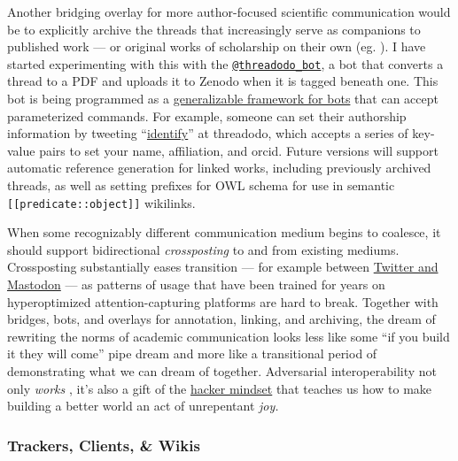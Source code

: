 Another bridging overlay for more author-focused scientific
communication would be to explicitly archive the threads that
increasingly serve as companions to published work --- or original works
of scholarship on their own (eg. \citep{bostonNeedKnowInformationSeeking2022} ). I have started experimenting
with this with the
\href{https://twitter.com/threadodo_bot}{\texttt{@threadodo\_bot}}, a
bot that converts a thread to a PDF and uploads it to Zenodo when it is tagged beneath one.
This bot is being programmed as a
\href{https://github.com/sneakers-the-rat/threadodo/blob/58d5f13f88728babdf2da0b34310c88349725566/threadodo/actions/commands.py\#L145-L168}{generalizable
framework for bots} that can accept parameterized commands. For example,
someone can set their authorship information by tweeting
``\href{https://twitter.com/json_dirs/status/1542305909983936512}{identify}''
at threadodo, which accepts a series of key-value pairs to set your
name, affiliation, and orcid. Future versions will support automatic
reference generation for linked works, including previously archived
threads, as well as setting prefixes for OWL schema for use in semantic
\texttt{{[}{[}predicate::object{]}{]}} wikilinks.

When some recognizably different communication medium begins to
coalesce, it should support bidirectional \emph{crossposting} to and
from existing mediums. Crossposting substantially eases transition ---
for example between
\href{https://crossposter.masto.donte.com.br/}{Twitter and Mastodon} ---
as patterns of usage that have been trained for years on hyperoptimized
attention-capturing platforms are hard to break. Together with bridges,
bots, and overlays for annotation, linking, and archiving, the dream of
rewriting the norms of academic communication looks less like some ``if
you build it they will come'' pipe dream and more like a transitional
period of demonstrating what we can dream of together. Adversarial
interoperability not only \emph{works} \citep{doctorowAdversarialInteroperability2019} , it's also a gift of the
\href{https://www.gwern.net/Unseeing}{hacker mindset} that teaches us
how to make building a better world an act of unrepentant \emph{joy.}

\hypertarget{trackers-clients-wikis}{%
\subsubsection{Trackers, Clients, \&
Wikis}\label{trackers-clients-wikis}}

